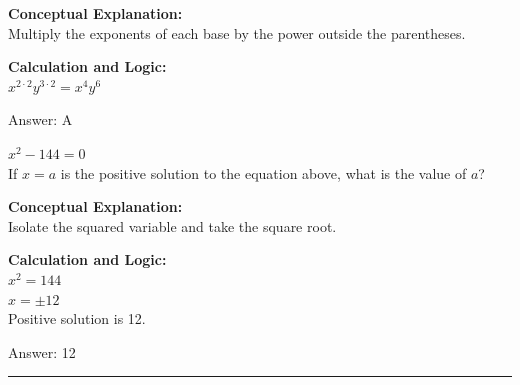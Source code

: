 \documentclass[11pt,paper=a4,answers]{exam}
\begin{document}
\begin{questions}
\begin{solution}
\textbf{Conceptual Explanation:} \\
Multiply the exponents of each base by the power outside the parentheses.

\vspace{20pt}

\textbf{Calculation and Logic:} \\
$x^{2 \cdot 2} y^{3 \cdot 2} = x^4 y^6$

\vspace{25pt}

Answer: \colorbox{yellow!100}{A}
\end{solution}

\vspace{40pt}

\question
$x^2 - 144 = 0$ \\
If $x = a$ is the positive solution to the equation above, what is the value of $a$?

\begin{solution}
\textbf{Conceptual Explanation:} \\
Isolate the squared variable and take the square root.

\vspace{20pt}

\textbf{Calculation and Logic:} \\
$x^2 = 144$ \\
$x = \pm 12$ \\
Positive solution is 12.

\vspace{25pt}

Answer: \colorbox{yellow!100}{12}
\end{solution}


\end{questions}
\begin{center}
\rule{.5\textwidth}{1pt}
\end{center}
\end{document}
